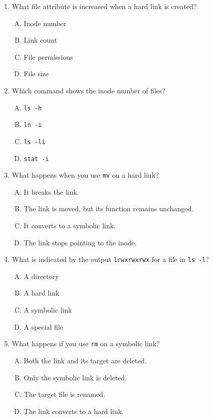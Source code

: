 \documentclass[a4paper]{report}
\begin{document}
\begin{enumerate}[1.]
    \item What file attribute is increased when a hard link is created?  
    \begin{enumerate}[A)]
        \item Inode number  
        \item Link count  
        \item File permissions  
        \item File size  
    \end{enumerate}

    \item Which command shows the inode number of files?  
    \begin{enumerate}[A)]
        \item \texttt{ls -h}  
        \item \texttt{ln -i}  
        \item \texttt{ls -li}  
        \item \texttt{stat -i}  
    \end{enumerate}

    \item What happens when you use \texttt{mv} on a hard link?  
    \begin{enumerate}[A)]
        \item It breaks the link.  
        \item The link is moved, but its function remains unchanged.  
        \item It converts to a symbolic link.  
        \item The link stops pointing to the inode.  
    \end{enumerate}

    \item What is indicated by the output \texttt{lrwxrwxrwx} for a file in \texttt{ls -l}?  
    \begin{enumerate}[A)]
        \item A directory  
        \item A hard link  
        \item A symbolic link  
        \item A special file  
    \end{enumerate}

    \item What happens if you use \texttt{rm} on a symbolic link?  
    \begin{enumerate}[A)]
        \item Both the link and its target are deleted.  
        \item Only the symbolic link is deleted.  
        \item The target file is renamed.  
        \item The link converts to a hard link.  
    \end{enumerate}


\end{enumerate}
\end{document}
